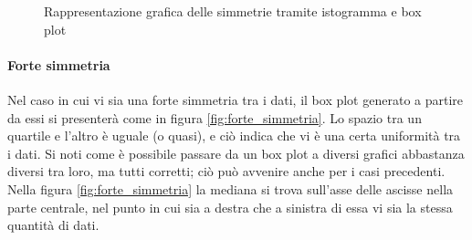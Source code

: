 \begin{figure}[h]
{{    }
}
    \caption{Rappresentazione grafica delle simmetrie tramite istogramma e box plot}
    \label{fig:simmetire}
    \vspace{\abovedisplayskip}
\end{figure}

\hspace{1cm}

\paragraph{Forte simmetria}
Nel caso in cui vi sia una forte simmetria tra i dati, il box plot generato a partire da essi si presenterà come in figura \ref{fig:forte_simmetria}. Lo spazio tra un quartile e l'altro è uguale (o quasi), e ciò indica che vi è una certa uniformità tra i dati.
\newline
Si noti come è possibile passare da un box plot a diversi grafici abbastanza diversi tra loro, ma tutti corretti; ciò può avvenire anche per i casi precedenti.
Nella figura \ref{fig:forte_simmetria} la mediana si trova sull'asse delle ascisse nella parte centrale, nel punto in cui sia a destra che a sinistra di essa vi sia la stessa quantità di dati.
\newline

